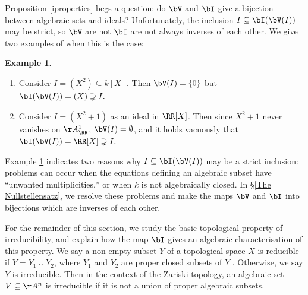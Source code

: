 \documentclass[12pt]{amsart}
\theoremstyle{plain}
\theoremstyle{definition}
\newtheorem{example}[theorem]{Example}
\begin{document}
Proposition \ref{iproperties} begs a question: do $\bV$ and $\bI$ give a bijection between algebraic sets and ideals?
Unfortunately, the inclusion $I \subseteq \bI(\bV(I))$ may be strict, so $\bV$ are not $\bI$ are not always inverses of each other.
We give two examples of when this is the case:

\begin{example}\label{inclfails}
\begin{enumerate}
\item
Consider $I = (X^2) \subseteq k[X]$.
Then $\bV(I) = \{0\}$ but $\bI(\bV(I)) = (X) \supsetneq I.$

\item
Consider $I = (X^2+1)$ as an ideal in $\RR[X]$.
Then since $X^2+1$ never vanishes on $\AA^1_\RR$, $\bV(I) = \emptyset$, and it holds vacuously that $\bI(\bV(I)) = \RR[X] \supsetneq I.$
\end{enumerate}
\end{example}

Example \ref{inclfails} indicates two reasons why $I \subseteq \bI(\bV(I))$ may be a strict inclusion:
problems can occur when the equations defining an algebraic subset have ``unwanted multiplicities,'' or when $k$ is not algebraically closed.
In \S \ref{The Nullstellensatz}, we resolve these problems and make the maps $\bV$ and $\bI$ into bijections which are inverses of each other.

For the remainder of this section, we study the basic topological property of irreducibility, and explain how the map $\bI$ gives an algebraic characterisation of this property.
We say a non-empty subset $Y$ of a topological space $X$ is reducible if $Y = Y_1 \cup Y_2$, where $Y_1$ and $Y_2$ are proper closed subsets of $Y$ \cite[Chapter I]{Hartshorne77}.
Otherwise, we say $Y$ is irreducible.
Then in the context of the Zariski topology, an algebraic set $V \subseteq \AA^n$ is irreducible if it is not a union of proper algebraic subsets.
\end{document}
